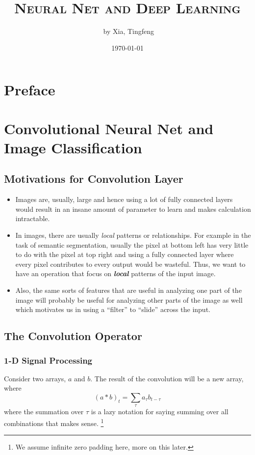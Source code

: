 \documentclass[11pt]{article}
\author{\ccLogo \,\,by Xia, Tingfeng}
\title{\textsc{Neural Net and Deep Learning}}
\date{\today}
\begin{document}
\maketitle
\section*{Preface}
\doclicenseThis
\tableofcontents
\newpage
\section{Convolutional Neural Net and Image Classification}
\subsection{Motivations for Convolution Layer}
\begin{itemize}
    \item Images are, usually, large and hence using a lot of fully connected layers would result in an insane amount of parameter to learn and makes calculation intractable.
    \item In images, there are usually \textit{local} patterns or relationships. For example in the task of semantic segmentation, usually the pixel at bottom left has very little to do with the pixel at top right and using a fully connected layer where every pixel contributes to every output would be wasteful. Thus, we want to have an operation that focus on \textit{\textbf{local}} patterns of the input image.
    \item Also, the same sorts of features that are useful in analyzing one part of the image will probably be useful for analyzing other parts of the image as well which motivates us in using a ``filter'' to ``slide'' across the input. 
\end{itemize}

\subsection{The Convolution Operator}
\subsubsection{1-D Signal Processing} Consider two arrays, $a$ and $b$. The result of the convolution will be a new array, where
\begin{equation}
    (a * b)_{t}=\sum_{\tau} a_{\tau} b_{t-\tau}
\end{equation}
where the summation over $\tau$ is a lazy notation for saying summing over all combinations that makes sense. \footnote{We assume infinite zero padding here, more on this later.}
\end{document}

